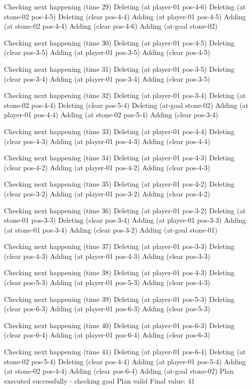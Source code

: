 Checking next happening (time 29)
Deleting (at player-01 pos-4-6)
Deleting (at stone-02 pos-4-5)
Deleting (clear pos-4-4)
Adding (at player-01 pos-4-5)
Adding (at stone-02 pos-4-4)
Adding (clear pos-4-6)
Adding (at-goal stone-02)

Checking next happening (time 30)
Deleting (at player-01 pos-4-5)
Deleting (clear pos-3-5)
Adding (at player-01 pos-3-5)
Adding (clear pos-4-5)

Checking next happening (time 31)
Deleting (at player-01 pos-3-5)
Deleting (clear pos-3-4)
Adding (at player-01 pos-3-4)
Adding (clear pos-3-5)

Checking next happening (time 32)
Deleting (at player-01 pos-3-4)
Deleting (at stone-02 pos-4-4)
Deleting (clear pos-5-4)
Deleting (at-goal stone-02)
Adding (at player-01 pos-4-4)
Adding (at stone-02 pos-5-4)
Adding (clear pos-3-4)

Checking next happening (time 33)
Deleting (at player-01 pos-4-4)
Deleting (clear pos-4-3)
Adding (at player-01 pos-4-3)
Adding (clear pos-4-4)

Checking next happening (time 34)
Deleting (at player-01 pos-4-3)
Deleting (clear pos-4-2)
Adding (at player-01 pos-4-2)
Adding (clear pos-4-3)

Checking next happening (time 35)
Deleting (at player-01 pos-4-2)
Deleting (clear pos-3-2)
Adding (at player-01 pos-3-2)
Adding (clear pos-4-2)

Checking next happening (time 36)
Deleting (at player-01 pos-3-2)
Deleting (at stone-01 pos-3-3)
Deleting (clear pos-3-4)
Adding (at player-01 pos-3-3)
Adding (at stone-01 pos-3-4)
Adding (clear pos-3-2)
Adding (at-goal stone-01)

Checking next happening (time 37)
Deleting (at player-01 pos-3-3)
Deleting (clear pos-4-3)
Adding (at player-01 pos-4-3)
Adding (clear pos-3-3)

Checking next happening (time 38)
Deleting (at player-01 pos-4-3)
Deleting (clear pos-5-3)
Adding (at player-01 pos-5-3)
Adding (clear pos-4-3)

Checking next happening (time 39)
Deleting (at player-01 pos-5-3)
Deleting (clear pos-6-3)
Adding (at player-01 pos-6-3)
Adding (clear pos-5-3)

Checking next happening (time 40)
Deleting (at player-01 pos-6-3)
Deleting (clear pos-6-4)
Adding (at player-01 pos-6-4)
Adding (clear pos-6-3)

Checking next happening (time 41)
Deleting (at player-01 pos-6-4)
Deleting (at stone-02 pos-5-4)
Deleting (clear pos-4-4)
Adding (at player-01 pos-5-4)
Adding (at stone-02 pos-4-4)
Adding (clear pos-6-4)
Adding (at-goal stone-02)
Plan executed successfully - checking goal
Plan valid
Final value: 41 

